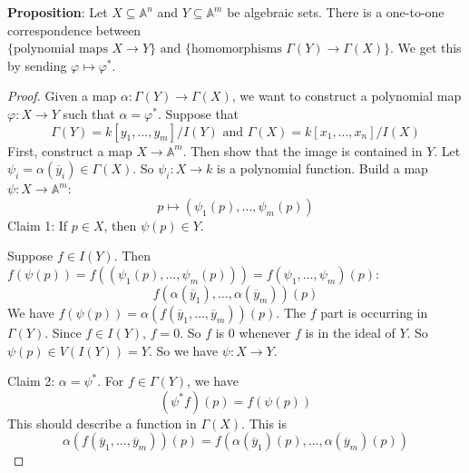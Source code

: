 \documentclass{report}
\begin{document}
\textbf{Proposition}: Let $X \subseteq \mathbb{A}^{n}$ and $Y \subseteq \mathbb{A}^{m}$ be algebraic sets. There is a one-to-one correspondence between $\{\text{polynomial maps $X \rightarrow Y$}\} \text{ and } \{\text{homomorphisms } \Gamma(Y) \rightarrow \Gamma(X)\}$. We get this by sending $\varphi \mapsto \varphi^{*}$.
    \begin{proof}
        Given a map $\alpha: \Gamma(Y) \rightarrow \Gamma(X)$, we want to construct a polynomial map $\varphi : X \rightarrow Y$ such that $\alpha = \varphi^{*}$. Suppose that
            \begin{equation*}
                \Gamma(Y) = k[y_{1}, \ldots , y_{m}]/I(Y) \text{ and } \Gamma(X) = k[x_{1}, \ldots , x_{n}]/I(X)
            \end{equation*}
        First, construct a map $X \rightarrow \mathbb{A}^{m}$. Then show that the image is contained in $Y$. Let $\psi_{i} = \alpha(\overline{y}_{i}) \in \Gamma(X)$. So $\psi_{i}: X \rightarrow k$ is a polynomial function. Build a map $\psi : X \rightarrow \mathbb{A}^{m}$:
            \begin{equation*}
                p \mapsto (\psi_{1}(p), \ldots , \psi_{m}(p))
            \end{equation*}
        Claim 1: If $p \in X$, then $\psi(p) \in Y$. 

        Suppose $f \in I(Y)$. Then $f(\psi(p)) = f((\psi_{1}(p), \ldots , \psi_{m}(p))) = f(\psi_{1}, \ldots , \psi_{m})(p)$:
            \begin{equation*}
                f(\alpha(\overline{y}_{1}), \ldots , \alpha(\overline{y}_{m}))(p)
            \end{equation*}
        We have $f(\psi(p)) = \alpha(f(\overline{y}_{1}, \ldots , \overline{y}_{m}))(p)$. The $f$ part is occurring in $\Gamma(Y)$. Since $f \in I(Y)$, $f = 0$. So $f$ is $0$ whenever $f$ is in the ideal of $Y$. So $\psi(p) \in V(I(Y)) = Y$. So we have $\psi: X \rightarrow Y$.

        Claim 2: $\alpha = \psi^{*}$. For $f \in \Gamma(Y)$, we have
            \begin{equation*}
                (\psi^{*}f)(p) = f(\psi(p))
            \end{equation*}
        This should describe a function in $\Gamma(X)$. This is
            \begin{equation*}
                \alpha(f(\overline{y}_{1}, \ldots , \overline{y}_{m}))(p) = f(\alpha(\overline{y}_{1})(p), \ldots , \alpha(\overline{y}_{m})(p))
            \end{equation*}


\end{proof}
\end{document}
